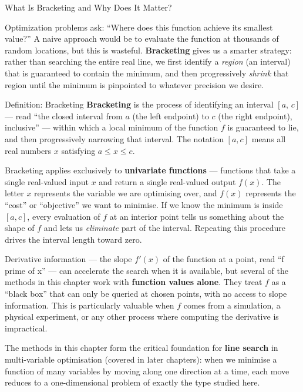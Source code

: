 \documentclass[aspectratio=169,10pt]{beamer}
\begin{document}
\begin{frame}[allowframebreaks]{What Is Bracketing and Why Does It Matter?}

  Optimization problems ask: ``Where does this function achieve its smallest
  value?''  A naive approach would be to evaluate the function at thousands of
  random locations, but this is wasteful.  \textbf{Bracketing} gives us a
  smarter strategy: rather than searching the entire real line, we first identify
  a \emph{region} (an interval) that is guaranteed to contain the minimum, and
  then progressively \emph{shrink} that region until the minimum is pinpointed
  to whatever precision we desire.

  \begin{block}{Definition: Bracketing}
    \textbf{Bracketing} is the process of identifying an interval $[a,\, c]$ ---
    read ``the closed interval from $a$ (the left endpoint) to $c$ (the right
    endpoint), inclusive'' --- within which a local minimum of the function $f$
    is guaranteed to lie, and then progressively narrowing that interval.
    The notation $[a, c]$ means all real numbers $x$ satisfying $a \le x \le c$.
  \end{block}

  Bracketing applies exclusively to \textbf{univariate functions} --- functions
  that take a single real-valued input $x$ and return a single real-valued
  output $f(x)$.  The letter $x$ represents the variable we are optimising over,
  and $f(x)$ represents the ``cost'' or ``objective'' we want to minimise.
  If we know the minimum is inside $[a, c]$, every evaluation of $f$ at an
  interior point tells us something about the shape of $f$ and lets us
  \emph{eliminate} part of the interval.  Repeating this procedure drives the
  interval length toward zero.

  Derivative information --- the slope $f'(x)$ of the function at a point,
  read ``f prime of x'' --- can accelerate the search when it is available, but
  several of the methods in this chapter work with \textbf{function values alone}.
  They treat $f$ as a ``black box'' that can only be queried at chosen points,
  with no access to slope information.  This is particularly valuable when $f$
  comes from a simulation, a physical experiment, or any other process where
  computing the derivative is impractical.

  The methods in this chapter form the critical foundation for
  \textbf{line search} in multi-variable optimisation (covered in later chapters):
  when we minimise a function of many variables by moving along one direction at a
  time, each move reduces to a one-dimensional problem of exactly the type studied
  here.


\end{frame}
\end{document}
